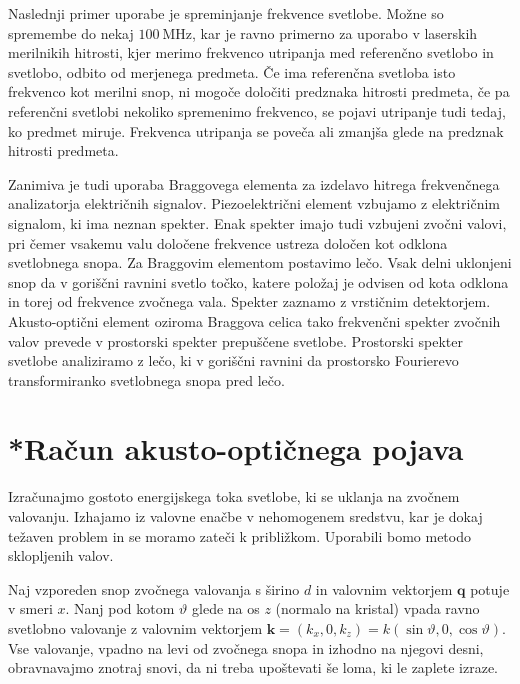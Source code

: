 Naslednji primer uporabe je spreminjanje frekvence svetlobe. Možne so spremembe
do nekaj $100~\si{\mega\hertz}$, kar je ravno primerno za uporabo v laserskih merilnikih
hitrosti, kjer merimo frekvenco utripanja med referenčno svetlobo in svetlobo, odbito od
merjenega predmeta. Če ima referenčna svetloba
isto frekvenco kot merilni snop, ni mogoče določiti predznaka hitrosti
predmeta, če pa referenčni svetlobi nekoliko spremenimo frekvenco,
se pojavi utripanje tudi tedaj, ko predmet miruje. Frekvenca utripanja
se poveča ali zmanjša glede na predznak hitrosti predmeta.

Zanimiva je tudi uporaba Braggovega elementa za izdelavo
hitrega frekvenčnega analizatorja električnih signalov.  
Piezoelektrični element vzbujamo z električnim signalom,
ki ima neznan spekter. Enak spekter imajo tudi vzbujeni zvočni valovi, 
pri čemer vsakemu valu določene frekvence ustreza določen kot odklona svetlobnega
snopa. Za Braggovim elementom postavimo lečo. Vsak delni uklonjeni
snop da v goriščni ravnini svetlo točko, katere položaj je odvisen
od kota odklona in torej od frekvence zvočnega vala. Spekter zaznamo
z vrstičnim detektorjem. Akusto-optični element oziroma Braggova celica 
tako frekvenčni spekter zvočnih valov prevede v prostorski
spekter prepuščene svetlobe. Prostorski spekter svetlobe
analiziramo z lečo, ki v goriščni ravnini da prostorsko
Fourierevo transformiranko svetlobnega snopa pred lečo.

\section{*Račun akusto-optičnega pojava}
Izračunajmo gostoto energijskega toka svetlobe, ki se uklanja na zvočnem valovanju. Izhajamo 
iz valovne enačbe v nehomogenem sredstvu, kar je dokaj težaven problem
in se moramo zateči k približkom. Uporabili bomo metodo sklopljenih valov. 

Naj vzporeden snop zvočnega valovanja s širino $d$ in valovnim vektorjem $\mathbf{q}$ 
potuje v smeri $x$.
Nanj pod kotom $\vartheta$ glede na os $z$ (normalo na kristal) 
vpada ravno svetlobno valovanje z valovnim vektorjem 
$\mathbf{k}=(k_{x},0,k_{z})= k(\sin\vartheta,0,\cos\vartheta)$.
Vse valovanje, vpadno na levi od zvočnega snopa in izhodno na njegovi desni,
obravnavajmo znotraj snovi, da ni treba upoštevati še loma, ki
le zaplete izraze. 

